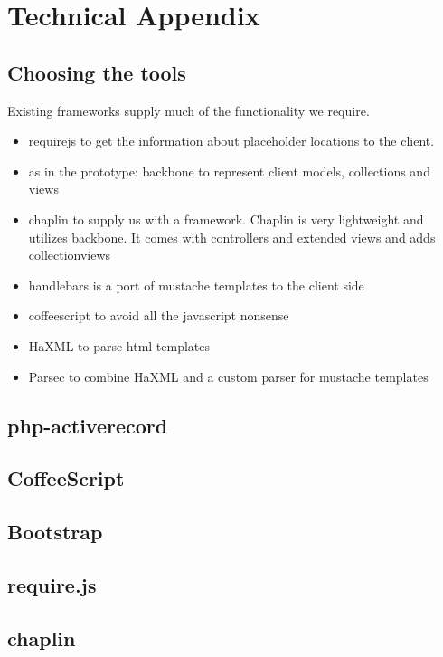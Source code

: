 \documentclass[thesis.tex]{subfiles}
\begin{document}
\appendix
\chapter{Technical Appendix}
\section{Choosing the tools}
Existing frameworks supply much of the functionality we require.
\begin{itemize}
\item requirejs to get the information about placeholder locations to the client.
\item as in the prototype: backbone to represent client models,
	collections and views
\item chaplin to supply us with a framework. Chaplin is very lightweight and
	utilizes backbone. It comes with controllers and extended views and adds
	collectionviews
\item handlebars is a port of mustache templates to the client side
\item coffeescript to avoid all the javascript nonsense
\item HaXML to parse html templates
\item Parsec to combine HaXML and a custom parser for mustache templates
\end{itemize}



\section{php-activerecord}
\label{sec:php-activerecord}

\section{CoffeeScript}
\label{sec:coffeescript}

\section{Bootstrap}
\label{sec:bootstrap}

\section{require.js}
\label{sec:requirejs}

\section{chaplin}
\label{sec:chaplin}
\end{document}
